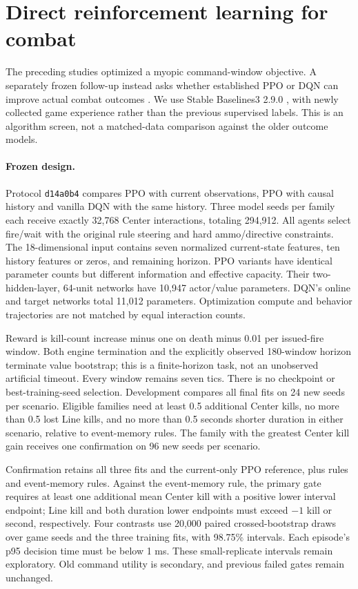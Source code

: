 \section{Direct reinforcement learning for combat}
The preceding studies optimized a myopic command-window objective. A separately frozen follow-up instead asks whether established PPO or DQN can improve actual combat outcomes \citep{schulman2017ppo,mnih2015human}. We use Stable Baselines3 2.9.0 \citep{raffin2021stable}, with newly collected game experience rather than the previous supervised labels. This is an algorithm screen, not a matched-data comparison against the older outcome models.

\paragraph{Frozen design.}
Protocol \texttt{d14a0b4} compares PPO with current observations, PPO with causal history and vanilla DQN with the same history. Three model seeds per family each receive exactly 32,768 Center interactions, totaling 294,912. All agents select fire/wait with the original rule steering and hard ammo/directive constraints. The 18-dimensional input contains seven normalized current-state features, ten history features or zeros, and remaining horizon. PPO variants have identical parameter counts but different information and effective capacity. Their two-hidden-layer, 64-unit networks have 10,947 actor/value parameters. DQN's online and target networks total 11,012 parameters. Optimization compute and behavior trajectories are not matched by equal interaction counts.

Reward is kill-count increase minus one on death minus 0.01 per issued-fire window. Both engine termination and the explicitly observed 180-window horizon terminate value bootstrap; this is a finite-horizon task, not an unobserved artificial timeout. Every window remains seven tics. There is no checkpoint or best-training-seed selection. Development compares all final fits on 24 new seeds per scenario. Eligible families need at least 0.5 additional Center kills, no more than 0.5 lost Line kills, and no more than 0.5 seconds shorter duration in either scenario, relative to event-memory rules. The family with the greatest Center kill gain receives one confirmation on 96 new seeds per scenario.

Confirmation retains all three fits and the current-only PPO reference, plus rules and event-memory rules. Against the event-memory rule, the primary gate requires at least one additional mean Center kill with a positive lower interval endpoint; Line kill and both duration lower endpoints must exceed $-1$ kill or second, respectively. Four contrasts use 20,000 paired crossed-bootstrap draws over game seeds and the three training fits, with 98.75\% intervals. Each episode's p95 decision time must be below 1 ms. These small-replicate intervals remain exploratory. Old command utility is secondary, and previous failed gates remain unchanged.

